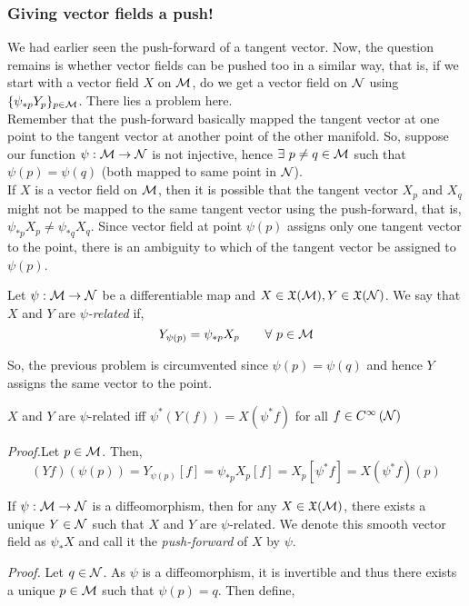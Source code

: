 \subsubsection{Giving vector fields a push!}
We had earlier seen the push-forward of a tangent vector. Now, the question remains is whether vector fields can be pushed too in a similar way, that is, if we start with a vector field $X$ on $\mathcal M$, do we get a vector field on $\mathcal N$ using $\{\psi_{*p}Y_p\}_{p\in \mathcal M}$. There lies a problem here. \\[0.2cm] Remember that the push-forward basically mapped the tangent vector at one point to the tangent vector at another point of the other manifold. So, suppose our function $\psi:\mathcal M\rightarrow\mathcal N$ is not injective, hence $\exists \ p\neq q \in \mathcal M$ such that $\psi(p)=\psi(q)$ (both mapped to same point in $\mathcal N$).\\[0.2cm] If $X$ is a vector field on $\mathcal M$, then it is possible that the tangent vector $X_p$ and $X_q$ might not be mapped to the same tangent vector using the push-forward, that is, $\psi_{*p} X_p \neq \psi_{*q}X_q$. Since vector field at point $\psi(p)$ assigns only one tangent vector to the point, there is an ambiguity to which of the tangent vector be assigned to $\psi(p)$.\\[0.2cm]
\begin{definition}
  Let $\psi:\mathcal M\rightarrow\mathcal N$ be a differentiable map and $X\in\mathfrak{X}(\mathcal M),Y\in\mathfrak{X}(\mathcal N)$. We say that $X$ and $Y$ are \textit{$\psi$-related} if,
  $$Y_{\psi(p)} = \psi_{*p}X_p\qquad \forall\ p\in\mathcal M$$
\end{definition}
So, the previous problem is circumvented since $\psi(p)=\psi(q)$ and hence $Y$ assigns the same vector to the point. 
\begin{proposition}\label{proposition:psirel}
  $X$ and $Y$ are $\psi$-related iff $\psi^*(Y(f)) = X(\psi^*f)$ for all $f\in C^{\infty}\left(\mathcal N\right)$ 
\end{proposition}
\textit{Proof.}Let $p\in \mathcal M$. Then, $$(Yf)(\psi(p)) = Y_{\psi(p)}[f] = \psi_{*p}X_p[f] = X_p[\psi^*f] = X(\psi^*f)(p)$$
\begin{theorem}
  If $\psi:\mathcal M\rightarrow \mathcal N$ is a diffeomorphism, then for any $X\in \mathfrak{X}(\mathcal M)$, there exists a unique $Y\in \mathcal N$ such that $X$ and $Y$ are $\psi$-related. We denote this smooth vector field as $\psi_*X$ and call it the \textit{push-forward } of $X$ by $\psi$.
\end{theorem}
\textit{Proof.} Let $q\in \mathcal N$. As $\psi$ is a diffeomorphism, it is invertible and thus there exists a unique $p\in \mathcal M$ such that $\psi(p) = q$. Then define,
